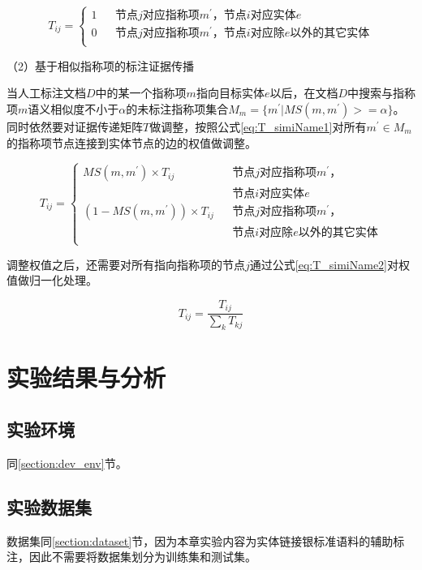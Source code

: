 \begin{equation}\label{eq:T_dupName}
	T_{ij}=\left\{
	\begin{array}{rcl}
	1      &      & {\text{节点}j\text{对应指称项}m^{'}\text{，节点}i\text{对应实体}e}\\
	0    &      &{\text{节点}j\text{对应指称项}m^{'}\text{，节点}i\text{对应除}e\text{以外的其它实体}}\\
	\end{array} \right.
\end{equation}

（2）基于相似指称项的标注证据传播
	
当人工标注文档$D$中的某一个指称项$m$指向目标实体$e$以后，在文档$D$中搜索与指称项$m$语义相似度不小于$\alpha$的未标注指称项集合$M_m=\{m^{'}|MS(m,m^{'})>=\alpha\}$。同时依然要对证据传递矩阵$T$做调整，按照公式\ref{eq:T_simiName1}对所有$m^{'}\in M_m$的指称项节点连接到实体节点的边的权值做调整。
	
\begin{equation}\label{eq:T_simiName1}
	T_{ij}=\left\{
	\begin{array}{rcl}
	MS(m,m^{'})\times T_{ij}      &      & {\text{节点}j\text{对应指称项}m^{'}\text{，}}\\
	&	&{\text{节点}i\text{对应实体}e}\\
	(1-MS(m,m^{'}))\times T_{ij}    &      &{\text{节点}j\text{对应指称项}m^{'}\text{，}}\\
	&	&{\text{节点}i\text{对应除}e\text{以外的其它实体}}\\
	\end{array} \right.
\end{equation}
	
调整权值之后，还需要对所有指向指称项的节点$j$通过公式\ref{eq:T_simiName2}对权值做归一化处理。
	
\begin{equation}\label{eq:T_simiName2}
	T_{ij}=\frac{T_{ij}}{\sum_{k} {T_{kj}}}
\end{equation}

\section{实验结果与分析}
\subsection{实验环境}
同\ref{section:dev_env}节。

\subsection{实验数据集}
数据集同\ref{section:dataset}节，因为本章实验内容为实体链接银标准语料的辅助标注，因此不需要将数据集划分为训练集和测试集。

